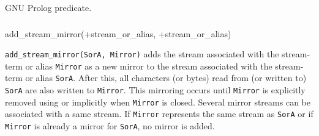 GNU Prolog predicate.

\subsubsection{\label{add-stream-mirror/2}}

\begin{TemplatesOneCol}
add\_stream\_mirror(+stream\_or\_alias, +stream\_or\_alias)

\end{TemplatesOneCol}

\Description

\texttt{add\_stream\_mirror(SorA, Mirror)} adds the stream associated with
the stream-term or alias \texttt{Mirror} as a new mirror to the stream
associated with the stream-term or alias \texttt{SorA}. After this, all
characters (or bytes) read from (or written to) \texttt{SorA} are also
written to \texttt{Mirror}. This mirroring occurs until \texttt{Mirror} is
explicitly removed using 
 or implicitly when \texttt{Mirror} is closed.
Several mirror streams can be associated with a same stream. If \texttt{Mirror}
represents the same stream as \texttt{SorA} or if \texttt{Mirror} is already
a mirror for \texttt{SorA}, no mirror is added.

\begin{PlErrors}








\end{PlErrors}

\Portability

